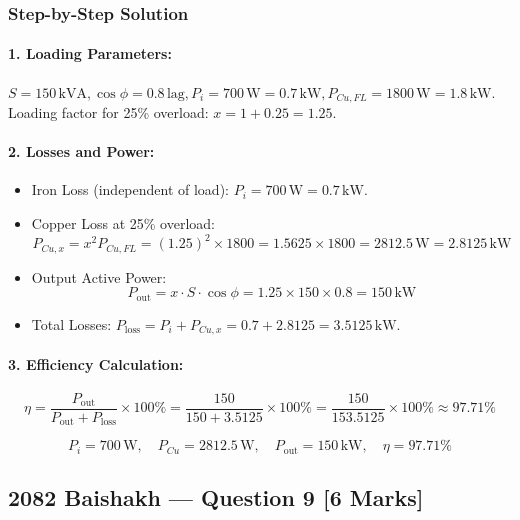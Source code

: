 \documentclass[11pt,a4paper,oneside]{article}
\begin{document}
\subsubsection*{Step-by-Step Solution}
\paragraph{1. Loading Parameters:}
$S = 150\,\mathrm{kVA}, \cos\phi = 0.8\,\mathrm{lag}, P_i = 700\,\mathrm{W} = 0.7\,\mathrm{kW}, P_{Cu,FL} = 1800\,\mathrm{W} = 1.8\,\mathrm{kW}$.
Loading factor for 25\% overload: $x = 1 + 0.25 = 1.25$.
\paragraph{2. Losses and Power:}
\begin{itemize}[leftmargin=1.5em]
  \item Iron Loss (independent of load): $P_i = 700\,\mathrm{W} = 0.7\,\mathrm{kW}$.
  \item Copper Loss at 25\% overload:
  \[
  P_{Cu,x} = x^2 P_{Cu,FL} = (1.25)^2 \times 1800 = 1.5625 \times 1800 = 2812.5\,\mathrm{W} = 2.8125\,\mathrm{kW}
  \]
  \item Output Active Power:
  \[
  P_{\text{out}} = x \cdot S \cdot \cos\phi = 1.25 \times 150 \times 0.8 = 150\,\mathrm{kW}
  \]
  \item Total Losses: $P_{\text{loss}} = P_i + P_{Cu,x} = 0.7 + 2.8125 = 3.5125\,\mathrm{kW}$.
\end{itemize}
\paragraph{3. Efficiency Calculation:}
\begin{equation}
  \eta = \frac{P_{\text{out}}}{P_{\text{out}} + P_{\text{loss}}} \times 100\% = \frac{150}{150 + 3.5125} \times 100\% = \frac{150}{153.5125} \times 100\% \approx 97.71\%
\end{equation}

\begin{answerbox}
\[
P_i = 700\,\mathrm{W}, \quad P_{Cu} = 2812.5\,\mathrm{W}, \quad P_{\text{out}} = 150\,\mathrm{kW}, \quad \eta = 97.71\%
\]
\end{answerbox}

\newpage

\subsection{2082 Baishakh --- Question 9 [6 Marks]}
\end{document}
